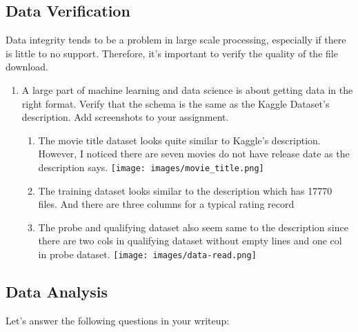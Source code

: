 \documentclass[paper=a4, fontsize=11pt]{scrartcl} %
\begin{document}
\subsection{Data Verification}

Data integrity tends to be a problem in large scale processing, especially if there is little to no support. Therefore, it's important to verify the quality of the file download.

\noindent
\begin{enumerate}
\item A large part of machine learning and data science is about getting data in the right format. Verify that the schema is the same as the Kaggle Dataset's description. Add screenshots to your assignment.
    \begin{enumerate}
        \item The movie title dataset looks quite similar to Kaggle's description. However, I noticed there are seven movies do not have release date as the description says.
        \texttt{[image: images/movie\_title.png]}
        \item The training dataset looks similar to the description which has 17770 files. And there are three columns for a typical rating record
        \item The probe and qualifying dataset also seem same to the description since there are two cols in qualifying dataset without empty lines and one col in probe dataset. 
        \texttt{[image: images/data-read.png]}
    \end{enumerate}
\end{enumerate}

\subsection{Data Analysis}
\label{sec:data-analysis}

Let's answer the following questions in your writeup: 
\end{document}
